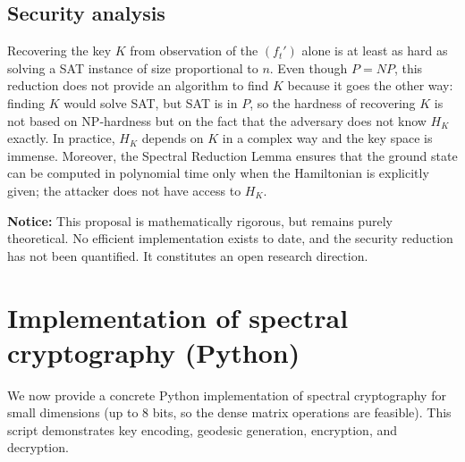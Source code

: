 \documentclass[11pt,a4paper]{article}
\begin{document}
\subsection{Security analysis}
Recovering the key \(K\) from observation of the \((f_t')\) alone is at least as hard as solving a SAT instance of size proportional to \(n\). Even though \(P = NP\), this reduction does not provide an algorithm to find \(K\) because it goes the other way: finding \(K\) would solve SAT, but SAT is in \(P\), so the hardness of recovering \(K\) is not based on NP‑hardness but on the fact that the adversary does not know \(H_K\) exactly. In practice, \(H_K\) depends on \(K\) in a complex way and the key space is immense. Moreover, the Spectral Reduction Lemma ensures that the ground state can be computed in polynomial time only when the Hamiltonian is explicitly given; the attacker does not have access to \(H_K\).

\textbf{Notice:} This proposal is mathematically rigorous, but remains purely theoretical. No efficient implementation exists to date, and the security reduction has not been quantified. It constitutes an open research direction.

\section{Implementation of spectral cryptography (Python)}

We now provide a concrete Python implementation of spectral cryptography for small dimensions (up to 8 bits, so the dense matrix operations are feasible). This script demonstrates key encoding, geodesic generation, encryption, and decryption.
\end{document}
